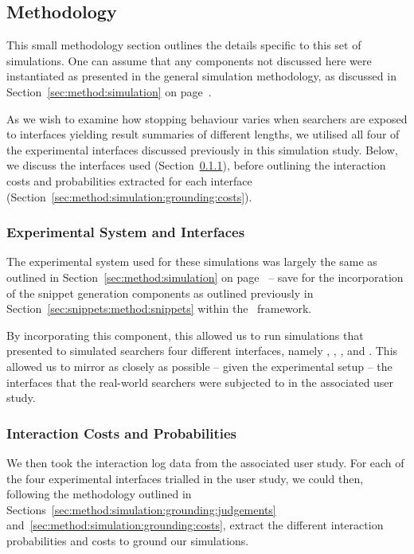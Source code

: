 \subsection{Methodology}\label{sec:snippets:simulations:method}
This small methodology section outlines the details specific to this set of simulations. One can assume that any components not discussed here were instantiated as presented in the general simulation methodology, as discussed in Section~\ref{sec:method:simulation} on page~\pageref{sec:method:simulation}.

As we wish to examine how stopping behaviour varies when searchers are exposed to interfaces yielding result summaries of different lengths, we utilised all four of the experimental interfaces discussed previously in this simulation study. Below, we discuss the interfaces used (Section~\ref{sec:snippets:simulations:method:interfaces}), before outlining the interaction costs and probabilities extracted for each interface (Section~\ref{sec:method:simulation:grounding:costs}).

\subsubsection{Experimental System and Interfaces}\label{sec:snippets:simulations:method:interfaces}
The experimental system used for these simulations was largely the same as outlined in Section~\ref{sec:method:simulation} on page~\pageref{sec:method:simulation} -- save for the incorporation of the snippet generation components as outlined previously in Section~\ref{sec:snippets:method:snippets} within the \simiir~framework.

By incorporating this component, this allowed us to run simulations that presented to simulated searchers four different interfaces, namely , , , and . This allowed us to mirror as closely as possible -- given the experimental setup -- the interfaces that the real-world searchers were subjected to in the associated user study.

\subsubsection{Interaction Costs and Probabilities}\label{sec:snippets:simulations:method:costs}
We then took the interaction log data from the associated user study. For each of the four experimental interfaces trialled in the user study, we could then, following the methodology outlined in Sections~\ref{sec:method:simulation:grounding:judgements} and~\ref{sec:method:simulation:grounding:costs}, extract the different interaction probabilities and costs to ground our simulations.

